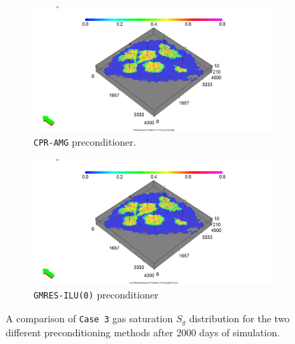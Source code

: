 \begin{figure}
\centering
\begin{subfigure}{.5\textwidth}
  \centering
  \includegraphics[width=1.3\linewidth]{figures/case3_cpr_sgas.png}
  \caption{\texttt{CPR-AMG} preconditioner.}
\end{subfigure}%
\begin{subfigure}{.5\textwidth}
  \centering
  \includegraphics[width=1.3\linewidth]{figures/case3_ilu_sgas.png}
  \caption{\texttt{GMRES-ILU(0)} preconditioner}
\end{subfigure}
\caption{A comparison of \texttt{Case 3} gas saturation $S_{g}$ distribution for the two different preconditioning methods after 2000 days of simulation.}
\label{case3sg}
\end{figure}

